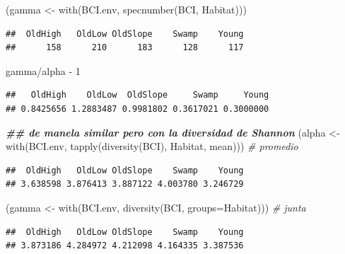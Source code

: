 \documentclass[
]{article}
\newenvironment{Shaded}{\begin{snugshade}}{\end{snugshade}}
\newcommand{\AttributeTok}[1]{\textcolor[rgb]{0.77,0.63,0.00}{#1}}
\newcommand{\CommentTok}[1]{\textcolor[rgb]{0.56,0.35,0.01}{\textit{#1}}}
\newcommand{\DecValTok}[1]{\textcolor[rgb]{0.00,0.00,0.81}{#1}}
\newcommand{\DocumentationTok}[1]{\textcolor[rgb]{0.56,0.35,0.01}{\textbf{\textit{#1}}}}
\newcommand{\FunctionTok}[1]{\textcolor[rgb]{0.00,0.00,0.00}{#1}}
\newcommand{\NormalTok}[1]{#1}
\newcommand{\OtherTok}[1]{\textcolor[rgb]{0.56,0.35,0.01}{#1}}
\newcommand{\SpecialCharTok}[1]{\textcolor[rgb]{0.00,0.00,0.00}{#1}}
\begin{document}
\begin{Shaded}
\begin{Highlighting}[]
\NormalTok{(gamma }\OtherTok{\textless{}{-}} \FunctionTok{with}\NormalTok{(BCI.env, }\FunctionTok{specnumber}\NormalTok{(BCI, Habitat)))}
\end{Highlighting}
\end{Shaded}

\begin{verbatim}
##  OldHigh   OldLow OldSlope    Swamp    Young 
##      158      210      183      128      117
\end{verbatim}

\begin{Shaded}
\begin{Highlighting}[]
\NormalTok{gamma}\SpecialCharTok{/}\NormalTok{alpha }\SpecialCharTok{{-}} \DecValTok{1}
\end{Highlighting}
\end{Shaded}

\begin{verbatim}
##   OldHigh    OldLow  OldSlope     Swamp     Young 
## 0.8425656 1.2883487 0.9981802 0.3617021 0.3000000
\end{verbatim}

\begin{Shaded}
\begin{Highlighting}[]
\DocumentationTok{\#\# de manela similar pero con la diversidad de Shannon}
\NormalTok{(alpha }\OtherTok{\textless{}{-}} \FunctionTok{with}\NormalTok{(BCI.env, }\FunctionTok{tapply}\NormalTok{(}\FunctionTok{diversity}\NormalTok{(BCI), Habitat, mean))) }\CommentTok{\# promedio}
\end{Highlighting}
\end{Shaded}

\begin{verbatim}
##  OldHigh   OldLow OldSlope    Swamp    Young 
## 3.638598 3.876413 3.887122 4.003780 3.246729
\end{verbatim}

\begin{Shaded}
\begin{Highlighting}[]
\NormalTok{(gamma }\OtherTok{\textless{}{-}} \FunctionTok{with}\NormalTok{(BCI.env, }\FunctionTok{diversity}\NormalTok{(BCI, }\AttributeTok{groups=}\NormalTok{Habitat))) }\CommentTok{\# junta}
\end{Highlighting}
\end{Shaded}

\begin{verbatim}
##  OldHigh   OldLow OldSlope    Swamp    Young 
## 3.873186 4.284972 4.212098 4.164335 3.387536
\end{verbatim}
\end{document}
